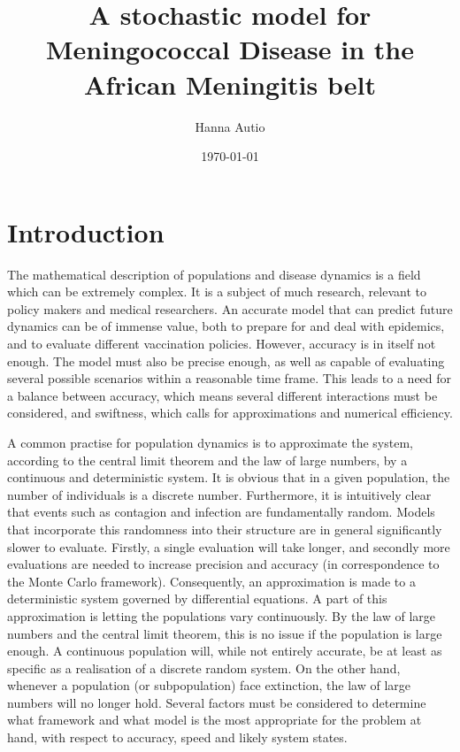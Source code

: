 \documentclass[10pt,a4paper]{article}
\author{Hanna Autio}
\title{A stochastic model for Meningococcal Disease in the African Meningitis belt} %
\date{\today}
\begin{document}
\maketitle
\thispagestyle{empty}
\cleardoublepage
\newpage
\setcounter{page}{1}



\section{Introduction}

The mathematical description of populations and disease dynamics is a field which can be extremely complex. It is a subject of much research, relevant to policy makers and medical researchers. An accurate model that can predict future dynamics can be of immense value, both to prepare for and deal with epidemics, and to evaluate different vaccination policies. However, accuracy is in itself not enough. The model must also be precise enough, as well as capable of evaluating several possible scenarios within a reasonable time frame. This leads to a need for a balance between accuracy, which means several different interactions must be considered, and swiftness, which calls for approximations and numerical efficiency.

A common practise for population dynamics is to approximate the system, according to the central limit theorem and the law of large numbers, by a continuous and deterministic system. It is obvious that in a given population, the number of individuals is a discrete number. Furthermore, it is intuitively clear that events such as contagion and infection are fundamentally random. Models that incorporate this randomness into their structure are in general significantly slower to evaluate. Firstly, a single evaluation will take longer, and secondly more evaluations are needed to increase precision and accuracy (in correspondence to the Monte Carlo framework). Consequently, an approximation is made to a deterministic system governed by differential equations. A part of this approximation is letting the populations vary continuously. By the law of large numbers and the central limit theorem, this is no issue if the population is large enough. A continuous population will, while not entirely accurate, be at least as specific as a realisation of a discrete random system. On the other hand, whenever a population (or subpopulation) face extinction, the law of large numbers will no longer hold. Several factors must be considered to determine what framework and what model is the most appropriate for the problem at hand, with respect to accuracy, speed and likely system states.
\end{document}
